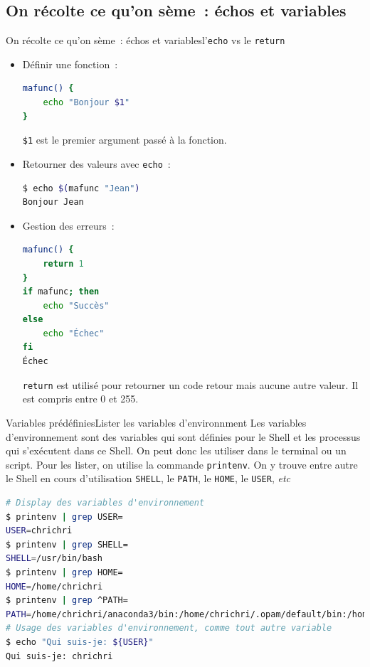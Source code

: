 \documentclass{beamer}
\begin{document}
    \subsection{On récolte ce qu'on sème~: échos et variables}\label{subsec:recolte}

    \begin{frame}[fragile]{On récolte ce qu'on sème~: échos et variables}{l'\lstinline{echo} vs le \lstinline{return}}
        \begin{itemize}
            \item Définir une fonction~:
            \begin{lstlisting}[language=bash,basicstyle=\ttfamily\tiny]
mafunc() {
    echo "Bonjour $1"
}
            \end{lstlisting}
            \lstinline{$1} est le premier argument passé à la fonction.
            \item Retourner des valeurs avec \lstinline{echo}~:
            \begin{lstlisting}[language=bash,basicstyle=\ttfamily\tiny]
$ echo $(mafunc "Jean")
Bonjour Jean
            \end{lstlisting}
            \item Gestion des erreurs~:
            \begin{lstlisting}[language=bash,basicstyle=\ttfamily\tiny]
mafunc() {
    return 1
}
if mafunc; then
    echo "Succès"
else
    echo "Échec"
fi
Échec
            \end{lstlisting}
            \lstinline{return} est utilisé pour retourner un code retour mais aucune autre valeur.
            Il est compris entre 0 et 255.
        \end{itemize}
    \end{frame}

    \begin{frame}[fragile]{Variables prédéfinies}{Lister les variables d'environnment}
        Les variables d'environnement sont des variables qui sont définies pour le Shell et les processus qui s'exécutent dans ce Shell.
        On peut donc les utiliser dans le terminal ou un script.
        \bigbreak
        Pour les lister, on utilise la commande \lstinline{printenv}.
        On y trouve entre autre le Shell en cours d'utilisation \lstinline{SHELL}, le \lstinline{PATH}, le \lstinline{HOME}, le \lstinline{USER}, \textit{etc}
        \begin{lstlisting}[language=bash,basicstyle=\tiny\ttfamily]
# Display des variables d'environnement
$ printenv | grep USER=
USER=chrichri
$ printenv | grep SHELL=
SHELL=/usr/bin/bash
$ printenv | grep HOME=
HOME=/home/chrichri
$ printenv | grep ^PATH=
PATH=/home/chrichri/anaconda3/bin:/home/chrichri/.opam/default/bin:/home/chrichri/.cargo/bin:/home/chrichri/.local/bin:/usr/local/sbin:/usr/local/bin:/usr/sbin:/usr/bin:/sbin:/bin:/usr/games:/usr/local/games:/snap/bin:/snap/bin:/home/chrichri/.dotnet/tools
# Usage des variables d'environnement, comme tout autre variable
$ echo "Qui suis-je: ${USER}"
Qui suis-je: chrichri
        \end{lstlisting}
    \end{frame}
\end{document}

